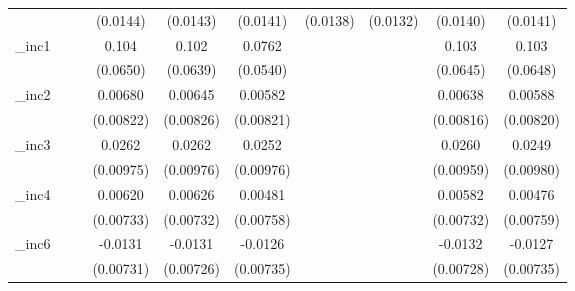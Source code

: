 \begin{table}[htbp]
\begin{tabular}{l*{9}{c}}
            &                     &                     &    (0.0144)         &    (0.0143)         &    (0.0141)         &    (0.0138)         &    (0.0132)         &    (0.0140)         &    (0.0141)         \\
[1em]
\_inc1       &                     &                     &       0.104         &       0.102         &      0.0762         &                     &                     &       0.103         &       0.103         \\
            &                     &                     &    (0.0650)         &    (0.0639)         &    (0.0540)         &                     &                     &    (0.0645)         &    (0.0648)         \\
[1em]
\_inc2       &                     &                     &     0.00680         &     0.00645         &     0.00582         &                     &                     &     0.00638         &     0.00588         \\
            &                     &                     &   (0.00822)         &   (0.00826)         &   (0.00821)         &                     &                     &   (0.00816)         &   (0.00820)         \\
[1em]
\_inc3       &                     &                     &      0.0262\sym{***}&      0.0262\sym{***}&      0.0252\sym{***}&                     &                     &      0.0260\sym{***}&      0.0249\sym{**} \\
            &                     &                     &   (0.00975)         &   (0.00976)         &   (0.00976)         &                     &                     &   (0.00959)         &   (0.00980)         \\
[1em]
\_inc4       &                     &                     &     0.00620         &     0.00626         &     0.00481         &                     &                     &     0.00582         &     0.00476         \\
            &                     &                     &   (0.00733)         &   (0.00732)         &   (0.00758)         &                     &                     &   (0.00732)         &   (0.00759)         \\
[1em]
\_inc6       &                     &                     &     -0.0131\sym{*}  &     -0.0131\sym{*}  &     -0.0126\sym{*}  &                     &                     &     -0.0132\sym{*}  &     -0.0127\sym{*}  \\
            &                     &                     &   (0.00731)         &   (0.00726)         &   (0.00735)         &                     &                     &   (0.00728)         &   (0.00735)         \\

\end{tabular}
\end{table}
